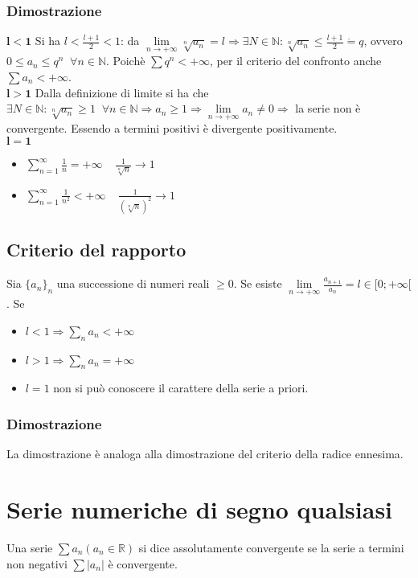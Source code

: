 \subsubsection{Dimostrazione}
$\mathbf{l<1}$ Si ha $l<\frac{l+1}{2}<1$: da $\lim\limits_{n\rightarrow+\infty}\sqrt[n]{a_n}=l\Rightarrow\exists N\in\mathbb{N}:\sqrt[n]{a_n}\le\frac{l+1}{2}\dot{=}q$, ovvero
$0\le a_n\le q^n\;\;\forall n\in\mathbb{N}$. Poich\`e $\sum q^n<+\infty$, per il criterio del confronto anche $\sum a_n<+\infty$.\\
$\mathbf{l>1}$ Dalla definizione di limite si ha che $\exists N\in\mathbb{N}:\sqrt[n]{a_n}\ge 1\;\;\forall n\in\mathbb{N}\Rightarrow a_n\ge 1\Rightarrow\lim\limits_{n\rightarrow+
\infty}a_n\neq 0\Rightarrow$ la serie non \`e convergente. Essendo a termini positivi \`e divergente positivamente.\\
$\mathbf{l=1}$
\begin{itemize}
\item $\sum\limits_{n=1}^\infty\frac{1}{n}=+\infty\;\;\;\;\frac{1}{\sqrt[n]{n}}\rightarrow 1$
\item $\sum\limits_{n=1}^\infty\frac{1}{n^2}<+\infty\;\;\;\;\frac{1}{(\sqrt[n]{n})^2}\rightarrow 1$
\end{itemize}
\subsection{Criterio del rapporto}
Sia $\{a_n\}_n$ una successione di numeri reali $\ge 0$. Se esiste $\lim\limits_{n\rightarrow+\infty}\frac{a_{n+1}}{a_n}=l\in[0;+\infty[$. Se
\begin{itemize}
\item $l<1\Rightarrow\sum\limits_n a_n<+\infty$
\item $l>1\Rightarrow\sum\limits_n a_n=+\infty$ 
\item $l=1$ non si pu\`o conoscere il carattere della serie a priori.
\end{itemize}
\subsubsection{Dimostrazione}
La dimostrazione \`e analoga alla dimostrazione del criterio della radice ennesima.
\section{Serie numeriche di segno qualsiasi}
Una serie $\sum a_n(a_n\in\mathbb{R})$ si dice assolutamente convergente se la serie a termini non negativi $\sum |a_n|$ \`e convergente.
